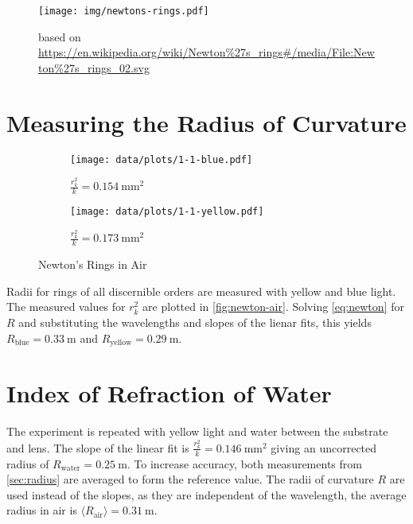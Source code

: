 \begin{figure}[tbp]
	\centering
	\texttt{[image: img/newtons-rings.pdf]}
	\caption{Newton's Rings}
	\label{fig:newton}
	\caption*{based on \url{https://en.wikipedia.org/wiki/Newton\%27s_rings\#/media/File:Newton\%27s_rings_02.svg}}
\end{figure}

\section{Measuring the Radius of Curvature}\label{sec:radius}

\begin{figure}[tbp]
	\centering
	\begin{subfigure}{.49\textwidth}
		\centering
		\texttt{[image: data/plots/1-1-blue.pdf]}
		\caption{Blue LED (\SI{465}{\nm})}
		\caption*{$\frac{r_k^2}{k} = \SI{0.154}{\mm\squared}$}
	\end{subfigure}
	\begin{subfigure}{.49\textwidth}
		\centering
		\texttt{[image: data/plots/1-1-yellow.pdf]}
		\caption{Yellow LED (\SI{590}{\nm})}
		\caption*{$\frac{r_k^2}{k} = \SI{0.173}{\mm\squared}$}
	\end{subfigure}
	\caption{Newton's Rings in Air}
	\label{fig:newton-air}
\end{figure}

Radii for rings of all discernible orders are measured with yellow and blue light.
The measured values for $r_k^2$ are plotted in \autoref{fig:newton-air}.
Solving \autoref{eq:newton} for $R$ and substituting the wavelengths and slopes of the lienar fits, this yields $R_\text{blue} = \SI{0.33}{\meter}$ and $R_\text{yellow} = \SI{0.29}{\meter}$.

\section{Index of Refraction of Water}

The experiment is repeated with yellow light and water between the substrate and lens.
The slope of the linear fit is $\frac{r_k^2}{k} = \SI{0.146}{\mm\squared}$ giving an uncorrected radius of $R_\text{water} = \SI{0.25}{\meter}$.
To increase accuracy, both measurements from \autoref{sec:radius} are averaged to form the reference value.
The radii of curvature $R$ are used instead of the slopes, as they are independent of the wavelength, the average radius in air is $\langle R_\text{air} \rangle = \SI{0.31}{\meter}$.

